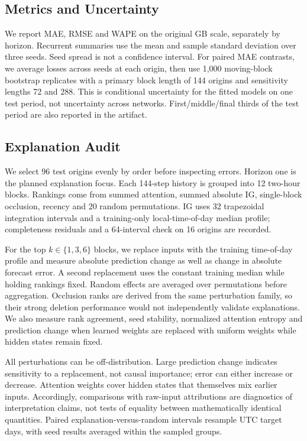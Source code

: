 \documentclass[conference]{IEEEtran}
\begin{document}
\subsection{Metrics and Uncertainty}
We report MAE, RMSE and WAPE on the original GB scale, separately by horizon. Recurrent summaries use the mean and sample standard deviation over three seeds. Seed spread is not a confidence interval. For paired MAE contrasts, we average losses across seeds at each origin, then use 1,000 moving-block bootstrap replicates with a primary block length of 144 origins and sensitivity lengths 72 and 288. This is conditional uncertainty for the fitted models on one test period, not uncertainty across networks. First/middle/final thirds of the test period are also reported in the artifact.

\subsection{Explanation Audit}
We select 96 test origins evenly by order before inspecting errors. Horizon one is the planned explanation focus. Each 144-step history is grouped into 12 two-hour blocks. Rankings come from summed attention, summed absolute IG, single-block occlusion, recency and 20 random permutations. IG uses 32 trapezoidal integration intervals and a training-only local-time-of-day median profile; completeness residuals and a 64-interval check on 16 origins are recorded.

For the top $k\in\{1,3,6\}$ blocks, we replace inputs with the training time-of-day profile and measure absolute prediction change as well as change in absolute forecast error. A second replacement uses the constant training median while holding rankings fixed. Random effects are averaged over permutations before aggregation. Occlusion ranks are derived from the same perturbation family, so their strong deletion performance would not independently validate explanations. We also measure rank agreement, seed stability, normalized attention entropy and prediction change when learned weights are replaced with uniform weights while hidden states remain fixed.

All perturbations can be off-distribution. Large prediction change indicates sensitivity to a replacement, not causal importance; error can either increase or decrease. Attention weights cover hidden states that themselves mix earlier inputs. Accordingly, comparisons with raw-input attributions are diagnostics of interpretation claims, not tests of equality between mathematically identical quantities. Paired explanation-versus-random intervals resample UTC target days, with seed results averaged within the sampled groups.
\end{document}
